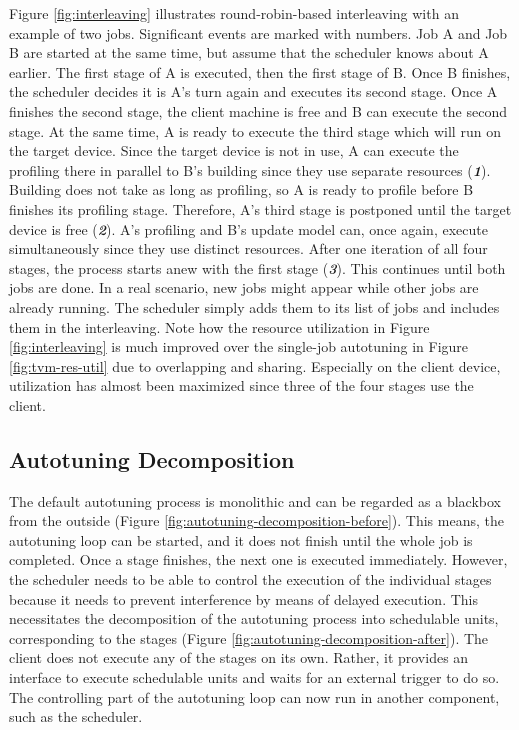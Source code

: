 Figure \ref{fig:interleaving} illustrates round-robin-based interleaving with an example of two jobs. Significant events are marked with numbers. Job A and Job B are started at the same time, but assume that the scheduler knows about A earlier. The first stage of A is executed, then the first stage of B. Once B finishes, the scheduler decides it is A's turn again and executes its second stage. Once A finishes the second stage, the client machine is free and B can execute the second stage. At the same time, A is ready to execute the third stage which will run on the target device. Since the target device is not in use, A can execute the profiling there in parallel to B's building since they use separate resources (\textbf{\textit{1}}). Building does not take as long as profiling, so A is ready to profile before B finishes its profiling stage. Therefore, A's third stage is postponed until the target device is free (\textbf{\textit{2}}). A's profiling and B's update model can, once again, execute simultaneously since they use distinct resources. After one iteration of all four stages, the process starts anew with the first stage (\textbf{\textit{3}}). This continues until both jobs are done. In a real scenario, new jobs might appear while other jobs are already running. The scheduler simply adds them to its list of jobs and includes them in the interleaving. Note how the resource utilization in Figure \ref{fig:interleaving} is much improved over the single-job autotuning in Figure \ref{fig:tvm-res-util} due to overlapping and sharing. Especially on the client device, utilization has almost been maximized since three of the four stages use the client.

\subsection{Autotuning Decomposition}
The default autotuning process is monolithic and can be regarded as a blackbox from the outside (Figure \ref{fig:autotuning-decomposition-before}). This means, the autotuning loop can be started, and it does not finish until the whole job is completed. Once a stage finishes, the next one is executed immediately. However, the scheduler needs to be able to control the execution of the individual stages because it needs to prevent interference by means of delayed execution. This necessitates the decomposition of the autotuning process into schedulable units, corresponding to the stages  (Figure \ref{fig:autotuning-decomposition-after}). The client does not execute any of the stages on its own. Rather, it provides an interface to execute schedulable units and waits for an external trigger to do so. The controlling part of the autotuning loop can now run in another component, such as the scheduler.

